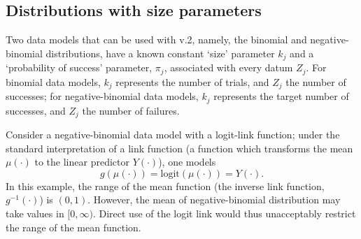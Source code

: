 \documentclass[nojss]{jss}
\def\mbf#1{{%
\mathchoice%
{\hbox{\boldmath$\displaystyle{#1}$}}%
{\hbox{\boldmath$\textstyle{#1}$}}%
{\hbox{\boldmath$\scriptstyle{#1}$}}%
{\hbox{\boldmath$\scriptscriptstyle{#1}$}}%
}}
\def\vec{\mbf}
\newcommand{\logit}[1]{\text{logit}\!\left(#1\right)} %
\newcommand{\ECurly}[1]{\mathbb{E}\left\{#1\right\}} %
\newcommand{\ESquare}[1]{\mathbb{E}\left[#1\right]} %
\newcommand{\varCurly}[1]{{\rm var}\left\{#1\right\}} %
\newcommand{\varSquare}[1]{{\rm var}\left[#1\right]} %
\newcommand{\pmugivenZ}[1]{\hat{p}_{\mu|\vec{Z}}\left(#1\right)}
\begin{document}
\begin{appendix}
  
 

\section{Distributions with size parameters}\label{sec:Distributions with size parameters}

Two data models that can be used with  v.2, namely, the binomial and negative-binomial distributions, have a known constant `size' parameter $k_j$ and a `probability of success' parameter, $\pi_j$, associated with every datum $Z_j$.
For binomial data models, $k_j$ represents the number of trials, and $Z_j$ the number of successes; for negative-binomial data models, $k_j$ represents the target number of successes, and $Z_j$ the number of failures. 

Consider a negative-binomial data model with a logit-link function; under the standard interpretation of a link function (a function which transforms the mean $\mu(\cdot)$ to the linear predictor $Y(\cdot)$), one models 
\[
g(\mu(\cdot)) = \logit{\mu(\cdot)} = Y(\cdot).
\]
In this example, the range of the mean function (the inverse link function, $g^{-1}(\cdot)$) is $(0, 1)$.
However, the mean of negative-binomial distribution may take values in $[0, \infty)$. 
Direct use of the logit link would thus unacceptably restrict the range of the mean function.


\end{appendix}
\end{document}
